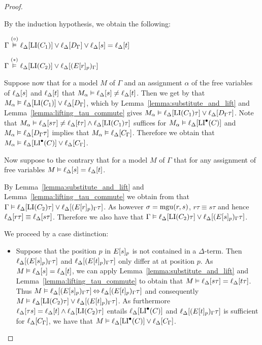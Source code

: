 \begin{proof}
\begin{description}
			By the induction hypothesis, we obtain the following: 

			$\Gamma \stackrel{(\circ)}{\vDash} \ell_{\Delta}[\operatorname{LI}(C_1)] \lor \ell_{\Delta}[D_\Gamma] \lor \ell_{\Delta}[s]=\ell_{\Delta}[t]$

			$\Gamma \stackrel{(*)}{\vDash} \ell_{\Delta}[\operatorname{LI}(C_2)] \lor \ell_{\Delta}[(E{[r]_{p}})_\Gamma]$

			Suppose now that for a model $M$ of $\Gamma$ and an assignment $\alpha$ of the free variables of $\ell_{\Delta}[s]$ and $\ell_{\Delta}[t]$ that $M_\alpha \vDash \ell_{\Delta}[s]\neq \ell_{\Delta}[t]$.
			Then we get by \markA{} that $M_\alpha \vDash \ell_{\Delta}[\operatorname{LI}(C_1)] \lor \ell_{\Delta}[D_\Gamma]$, which by Lemma~\ref{lemma:substitute_and_lift} and Lemma~\ref{lemma:lifting_tau_commute} gives $M_\alpha \vDash \ell_{\Delta}[\operatorname{LI}(C_1)\tau] \lor \ell_{\Delta}[D_\Gamma\tau]$.
			Note that $M_\alpha \vDash \ell_{\Delta}[s\tau]\neq \ell_{\Delta}[t\tau] \land \ell_{\Delta}[\operatorname{LI}(C_1)\tau]$ suffices for $M_\alpha \vDash \ell_{\Delta}[\operatorname{LI}^\bullet(C)]$ and $M_\alpha \vDash \ell_{\Delta}[D_\Gamma\tau]$ implies that $M_\alpha \vDash \ell_{\Delta}[C_\Gamma]$.
			Therefore we obtain that 
			$M_\alpha \vDash \ell_{\Delta}[\operatorname{LI}^\bullet(C)] \lor \ell_{\Delta}[C_\Gamma]$.

			Now suppose to the contrary that for a model $M$ of $\Gamma$ that for any assignment of free variables $M \entails \lifdeltanovar{s}\nolinebreak=\lifdeltanovar{t}$.

			By Lemma~\ref{lemma:substitute_and_lift} and  Lemma~\ref{lemma:lifting_tau_commute} we obtain from \markB{} that
			$\Gamma \vDash \ell_{\Delta}[\operatorname{LI}(C_2)\tau] \lor \ell_{\Delta}[(E{[r]_{p}})_\Gamma\tau]$.
			As however $\sigma = \operatorname{mgu}(r, s)$, $r\tau \equiv s\tau$
			and hence $\ell_{\Delta}[r\tau] \equiv \ell_{\Delta}[s\tau]$.
			Therefore we also have that 
			$\Gamma \vDash \ell_{\Delta}[\operatorname{LI}(C_2)\tau] \lor \ell_{\Delta}[(E{[s]_{p}})_\Gamma\tau]$.

			We proceed by a case distinction:
			\begin{itemize}
				\item Suppose that the position $p$ in $E{[s]_{p}}$ is not contained in a $\Delta$-term.
					Then
					$\ell_{\Delta}[(E{[s]_{p}})_\Gamma\tau]$
					and
					$\ell_{\Delta}[(E{[t]_{p}})_\Gamma\tau]$
					only differ at at position $p$.
					As $M \vDash \ell_{\Delta}[s] = \ell_{\Delta}[t]$, we can apply Lemma~\ref{lemma:substitute_and_lift} and Lemma~\ref{lemma:lifting_tau_commute} to obtain that 
					$M \vDash \ell_{\Delta}[s\tau] = \ell_{\Delta}[t\tau]$.
					Thus
					$M\vDash \ell_{\Delta}[(E{[s]_{p}})_\Gamma\tau] \operatorname{\Leftrightarrow} 
					\ell_{\Delta}[(E{[t]_{p}})_\Gamma\tau]$
					and consequently
					$M \vDash \ell_{\Delta}[\operatorname{LI}(C_2)\tau] \lor \ell_{\Delta}[(E{[t]_{p}})_\Gamma\tau]$.
					As furthermore $\ell_{\Delta}[\tau s] =\ell_{\Delta}[t] \land \ell_{\Delta}[\operatorname{LI}(C_2)\tau]$ entails $\ell_{\Delta}[\operatorname{LI}^\bullet(C)]$
					and $\ell_{\Delta}[(E{[t]_{p}})_\Gamma\tau]$ is sufficient for $\ell_{\Delta}[C_\Gamma]$,
					we have that 
					$M\vDash \ell_{\Delta}[\operatorname{LI}^\bullet(C)] \lor \ell_{\Delta}[C_\Gamma]$.


\end{itemize}
\end{description}
\end{proof}
